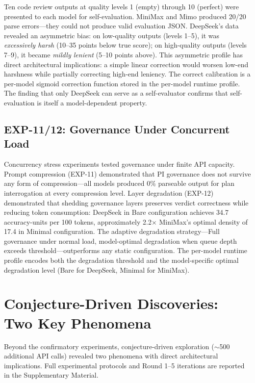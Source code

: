 \documentclass[11pt,a4paper]{article}
\begin{document}
Ten code review outputs at quality levels 1 (empty) through 10 (perfect) were presented to each model for self-evaluation. MiniMax and Mimo produced 20/20 parse errors---they could not produce valid evaluation JSON. DeepSeek's data revealed an asymmetric bias: on low-quality outputs (levels 1--5), it was \textit{excessively harsh} (10--35 points below true score); on high-quality outputs (levels 7--9), it became \textit{mildly lenient} (5--10 points above). This asymmetric profile has direct architectural implications: a simple linear correction would worsen low-end harshness while partially correcting high-end leniency. The correct calibration is a per-model sigmoid correction function stored in the per-model runtime profile. The finding that only DeepSeek can serve as a self-evaluator confirms that self-evaluation is itself a model-dependent property.

\subsection{EXP-11/12: Governance Under Concurrent Load}

Concurrency stress experiments tested governance under finite API capacity. Prompt compression (EXP-11) demonstrated that PI governance does not survive any form of compression---all models produced 0\% parseable output for plan interrogation at every compression level. Layer degradation (EXP-12) demonstrated that shedding governance layers preserves verdict correctness while reducing token consumption: DeepSeek in Bare configuration achieves 34.7 accuracy-units per 100 tokens, approximately 2.2$\times$ MiniMax's optimal density of 17.4 in Minimal configuration. The adaptive degradation strategy---Full governance under normal load, model-optimal degradation when queue depth exceeds threshold---outperforms any static configuration. The per-model runtime profile encodes both the degradation threshold and the model-specific optimal degradation level (Bare for DeepSeek, Minimal for MiniMax).

\section{Conjecture-Driven Discoveries: Two Key Phenomena}\label{sec:conjectures}

Beyond the confirmatory experiments, conjecture-driven exploration ($\sim$500 additional API calls) revealed two phenomena with direct architectural implications. Full experimental protocols and Round 1--5 iterations are reported in the Supplementary Material.
\end{document}
